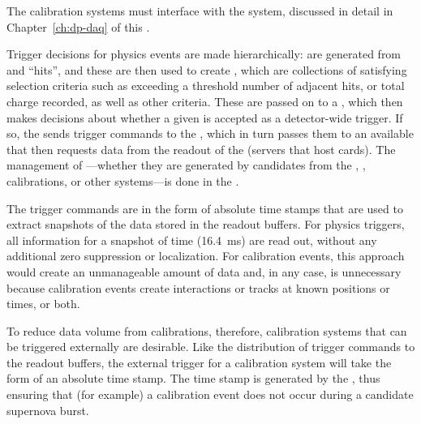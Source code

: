 
The calibration systems must interface with the   system, discussed in detail in %
Chapter~\ref{ch:dp-daq} of this .


Trigger decisions for physics events are made %
hierarchically:  are generated from %
 and  ``hits'', and these  are then used to create , which are collections of  satisfying selection criteria such as exceeding a threshold number of adjacent 
 hits, or total 
charge recorded, as well as other criteria. These  are passed on to a , which then makes decisions about whether a given  is accepted as a detector-wide trigger.  If so, the  sends trigger commands to the , which in turn passes them to an available  that then requests data from the  readout of the  (servers that host  cards). The management of ---whether they are generated by candidates from the , , calibrations, or other systems---is done in the . 

The trigger commands are in the form of absolute time stamps that are used to extract snapshots of the data stored in the  readout buffers. For physics triggers, all  information for a snapshot of time
(\SI{16.4}{\milli\s}) %
are read out, without any additional zero suppression or localization. For calibration events, this approach would create an unmanageable amount of data and, in any case, is unnecessary because calibration events create interactions or tracks at known positions or times, or both.


    To reduce data volume from calibrations, therefore, calibration systems that can be triggered externally are desirable. Like the distribution of trigger commands to the  readout buffers, the external trigger for a calibration system will take the form of an absolute time stamp. The time stamp is generated by the , thus ensuring that (for example) a calibration event does not occur during a candidate supernova burst.  
    

